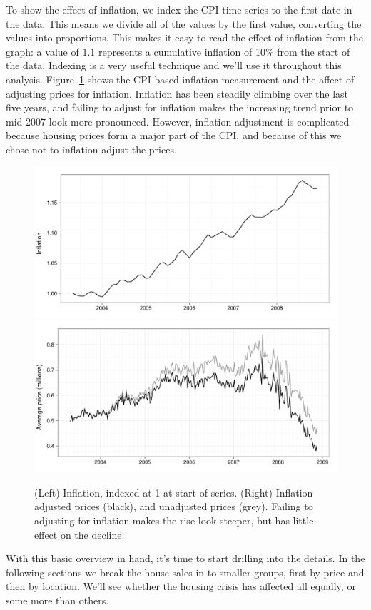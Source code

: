 \documentclass[oneside]{article}
\begin{document}
% 

To show the effect of inflation, we index the CPI time series to the first date in the data.  This means we divide all of the values by the first value, converting the values into proportions.  This makes it easy to read the effect of inflation from the graph: a value of 1.1 represents a cumulative inflation of 10\% from the start of the data.  Indexing is a very useful technique and we'll use it throughout this analysis.  Figure~\ref{fig:inflation} shows the CPI-based inflation measurement and the affect of adjusting prices for inflation.  Inflation has been steadily climbing over the last five years, and failing to adjust for inflation makes the increasing trend prior to mid 2007 look more pronounced.  However, inflation adjustment is complicated because housing prices form a major part of the CPI, and because of this we chose not to inflation adjust the prices.

\begin{figure}[htbp]
  \centering
    \includegraphics[width=0.5 \linewidth]{daily-cpi}%
    \includegraphics[width=0.5 \linewidth]{daily-price-adj}
  \caption{(Left) Inflation, indexed at 1 at start of series.  (Right) Inflation adjusted prices (black), and unadjusted prices (grey).  Failing to adjusting for inflation makes the rise look steeper, but has little effect on the decline.}
  \label{fig:inflation}
\end{figure}

With this basic overview in hand, it's time to start drilling into the details. In the following sections we break the house sales in to smaller groups, first by price and then by location.  We'll see whether the housing crisis has affected all equally, or some more than others.
\end{document}

